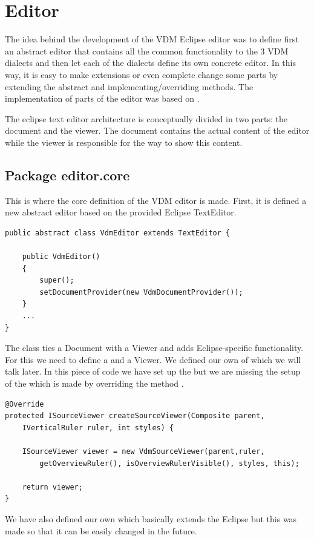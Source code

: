 \section{Editor}
The idea behind the development of the VDM Eclipse editor was to define first an abstract editor that contains all the common functionality to the 3 VDM dialects and then let each of the dialects define its own concrete editor. In this way, it is easy to make extensions or even complete change some parts by extending the abstract and implementing/overriding methods. The implementation of parts of the editor was based on \cite{Deva06}.

The eclipse text editor architecture is conceptually divided in two parts: the document and the viewer. The document contains the actual content of the editor while the viewer is responsible for the way to show this content. 

\subsection{Package editor.core}
This is where the core definition of the VDM editor is made. First, it is defined a new abstract editor based on the provided Eclipse TextEditor.

\begin{lstlisting}
public abstract class VdmEditor extends TextEditor {

	public VdmEditor()
	{
		super();
		setDocumentProvider(new VdmDocumentProvider());
	}
	...
}
\end{lstlisting}
The  class ties a Document with a Viewer and adds Eclipse-specific functionality. For this we need to define a  and a Viewer. We defined our own  of which we will talk later. In this piece of code we have set up the  but we are missing the setup of the  which is made by overriding the method .

\begin{lstlisting}
@Override
protected ISourceViewer createSourceViewer(Composite parent,
	IVerticalRuler ruler, int styles) {
	
	ISourceViewer viewer = new VdmSourceViewer(parent,ruler, 
		getOverviewRuler(), isOverviewRulerVisible(), styles, this);
		
	return viewer;		
}
\end{lstlisting}
We have also defined our own  which basically extends the Eclipse  but this was made so that it can be easily changed in the future.

